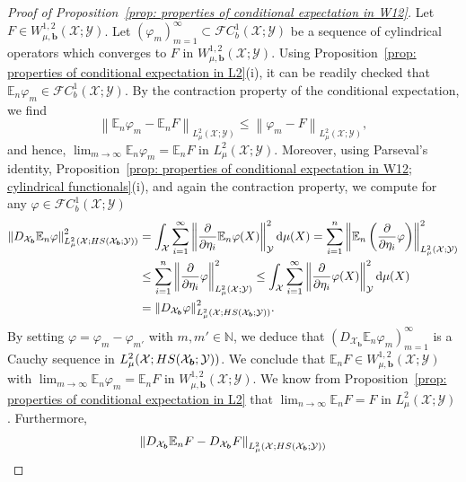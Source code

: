 \documentclass[namedate,webpdf]{ima-authoring-template-blank}
\def\D{\,\mathrm{d}}
\newcommand*{\HS}{\textup{HS}}
\newcommand*{\nm}[1]{{\left\|#1\right \|}}
\numberwithin{counter}{section}
\numberwithin{equation}{section}
\theoremstyle{plain}
\theoremstyle{definition}
\newcommand*{\cF}{\mathcal{F}}
\newcommand*{\cX}{\mathcal{X}}
\newcommand*{\cY}{\mathcal{Y}}
\newcommand*{\bbE}{\mathbb{E}}
\newcommand*{\bbN}{\mathbb{N}}
\theoremstyle{thmstyletwo}
\begin{document}
\begin{proof}[Proof of Proposition~\ref{prop: properties of conditional expectation in W12}]
    Let \( F \in W^{1,2}_{\mu, \bm{b}}(\cX; \cY) \). Let \( (\varphi_m)_{m = 1}^{\infty} \subset \cF C_b^1(\cX; \cY) \) be a sequence of cylindrical operators which converges to \( F \) in \( W^{1,2}_{\mu, \bm{b}}(\cX; \cY) \). Using Proposition~\ref{prop: properties of conditional expectation in L2}(i), it can be readily checked that \( \bbE_n \varphi_m \in \cF C_b^1(\cX; \cY) \). By the contraction property of the conditional expectation, we find
    \[
    \nm{ \bbE_n \varphi_m - \bbE_n F}_{L^2_{\mu}(\cX; \cY)} 
    \leq \nm{ \varphi_m - F}_{L^2_{\mu}(\cX; \cY)}, 
    \]
    and hence, \( \lim_{m \to \infty} \bbE_n \varphi_m = \bbE_n F \) in \( L^2_{\mu}(\cX; \cY) \). 
    Moreover, using Parseval's identity, Proposition~\ref{prop: properties of conditional expectation in W12; cylindrical functionals}(i), and again the contraction property, we compute for any \( \varphi \in \cF C_b^1(\cX; \cY) \)
    \begin{align*}
        \nm{D_{\cX_{\bm{b}}} \bbE_n \varphi}_{L_{\mu}^2(\cX; \HS(\cX_{\bm{b}}; \cY))}^2 
        &= \int_{\cX} \sum_{i = 1}^{\infty} \nm{\frac{\partial}{\partial \eta_i} \bbE_n \varphi(X)}_{\cY}^2 \D \mu(X)
        = \sum_{i = 1}^n \nm{\bbE_n \left(\frac{\partial}{\partial \eta_i} \varphi \right)}_{L_{\mu}^2(\cX; \cY)}^2 \\
        &\leq \sum_{i = 1}^n \nm{\frac{\partial}{\partial \eta_i} \varphi}_{L_{\mu}^2(\cX;\cY)}^2 
        \leq \int_{\cX} \sum_{i = 1}^{\infty} \nm{\frac{\partial}{\partial \eta_i} \varphi(X)}_{\cY}^2 \D \mu(X) \\
        &= \nm{D_{\cX_{\bm{b}}} \varphi}_{L_{\mu}^2(\cX; \HS(\cX_{\bm{b}}; \cY))}^2.
    \end{align*}   
    By setting \( \varphi = \varphi_m - \varphi_{m'} \) with \( m, m' \in \bbN \), we deduce that \( (D_{\cX_{\bm{b}}} \bbE_n \varphi_m)_{m = 1}^{\infty} \) is a Cauchy sequence in \( L_{\mu}^2(\cX; \HS(\cX_{\bm{b}}; \cY)) \). 
    We conclude that \( \bbE_n F \in W^{1,2}_{\mu, \bm{b}}(\cX; \cY) \) with \( \lim_{m \to \infty} \bbE_n \varphi_m = \bbE_n F \) in \( W^{1,2}_{\mu, \bm{b}}(\cX; \cY) \). 
    We know from Proposition~\ref{prop: properties of conditional expectation in L2} that \( \lim_{n \to \infty} \bbE_n F = F \) in \( L^2_{\mu}(\cX; \cY) \). Furthermore,
    \begin{align*}
        \nm{D_{\cX_{\bm{b}}} \bbE_n F - D_{\cX_{\bm{b}}} F}_{L_{\mu}^2(\cX; \HS(\cX_{\bm{b}}; \cY))} 

\end{align*}
\end{proof}
\end{document}
